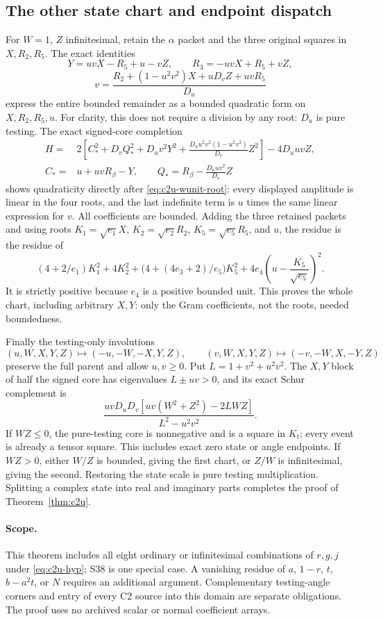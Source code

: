 \subsection{The other state chart and endpoint dispatch}
For $W=1$, $Z$ infinitesimal, retain the $\alpha$ packet and the three
original squares in $X,R_2,R_5$. The exact identities
\[
Y=uvX-R_5+u-vZ,\qquad R_3=-uvX+R_5+vZ,
\]
\begin{equation}
v=\frac{R_2+(1-u^2v^2)X+uD_vZ+uvR_5}{D_u}
\label{eq:c2u-wunit-root}
\end{equation}
express the entire bounded remainder as a bounded quadratic form on
$X,R_2,R_5,u$. For clarity, this does not require a division by any
root: $D_u$ is pure testing. The exact signed-core completion
\[
\begin{split}
H={}&2\left[C_*^2+D_vQ_*^2+D_uv^2Y^2
 +\frac{D_uu^2v^2(1-u^2v^2)}{D_v}Z^2\right]-4D_uuvZ,\\
C_*={}&u+uvR_\beta-Y,\qquad
Q_*=R_\beta-\frac{D_uuv^2}{D_v}Z
\end{split}
\]
shows quadraticity directly after \eqref{eq:c2u-wunit-root}: every
displayed amplitude is linear in the four roots, and the last indefinite
term is $u$ times the same linear expression for $v$. All coefficients
are bounded. Adding the three retained packets and using roots
$K_1=\sqrt{e_1}X$, $K_2=\sqrt{e_2}R_2$,
$K_5=\sqrt{e_5}R_5$, and $u$, the residue is the residue of
\[
(4+2/e_1)K_1^2+4K_2^2+
\bigl(4+(4e_3+2)/e_5\bigr)K_5^2
+4e_4\left(u-\frac{K_5}{\sqrt{e_5}}\right)^2.
\]
It is strictly positive because $e_4$ is a positive bounded unit.  This
proves the whole chart, including arbitrary $X,Y$: only the Gram
coefficients, not the roots, needed boundedness.

Finally the testing-only involutions
\[
(u,W,X,Y,Z)\mapsto(-u,-W,-X,Y,Z),\qquad
(v,W,X,Y,Z)\mapsto(-v,-W,X,-Y,Z)
\]
preserve the full parent and allow $u,v\ge0$. Put
$L=1+v^2+u^2v^2$. The $X,Y$ block of half the signed core has eigenvalues
$L\pm uv>0$, and its exact Schur complement is
\begin{equation}
 \frac{uvD_uD_v[uv(W^2+Z^2)-2LWZ]}{L^2-u^2v^2}.
\label{eq:c2u-core-schur}
\end{equation}
If $WZ\le0$, the pure-testing core is nonnegative and is a square in
$K_t$; every event is already a tensor square. This includes exact zero
state or angle endpoints. If $WZ>0$, either $W/Z$ is bounded, giving
the first chart, or $Z/W$ is infinitesimal, giving the second. Restoring
the state scale is pure testing multiplication. Splitting a complex
state into real and imaginary parts completes the proof of
Theorem~\ref{thm:c2u}.

\paragraph{Scope.}
This theorem includes all eight ordinary or infinitesimal combinations
of $r,g,j$ under \eqref{eq:c2u-hyp}; S38 is one special case.
A vanishing residue of $a$, $1-r$, $t$, $b-a^2t$, or $N$ requires
an additional argument.  Complementary testing-angle corners and
entry of every C2 source into this domain are separate obligations.
The proof uses no archived scalar or normal coefficient arrays.
